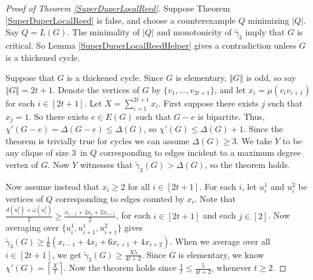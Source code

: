 \documentclass[12pt]{article}
\theoremstyle{plain}
\theoremstyle{definition}
\theoremstyle{remark}
\newcommand{\card}[1]{\left|#1\right|}
\newcommand{\size}[1]{\left\Vert#1\right\Vert}
\newcommand{\ceil}[1]{\left\lceil#1\right\rceil}
\begin{document}
\begin{proof}[Proof of Theorem \ref{SuperDuperLocalReed}]
Suppose Theorem \ref{SuperDuperLocalReed} is false, and choose a counterexample
$Q$ minimizing $\card{Q}$.  Say $Q = L(G)$.  The minimality of $\card{Q}$ and
monotonicity of $\tilde{\gamma}_3$ imply that $G$ is critical.  So Lemma
\ref{SuperDuperLocalReedHelper} gives
a contradiction unless $G$ is a thickened cycle.  

Suppose that $G$ is a thickened cycle.  Since $G$ is elementary, $\size{G}$ is
odd, so say $\size{G}=2t+1$.  Denote the vertices of $G$ by $\{v_1,\ldots,
v_{2t+1}\}$, and let $x_i = \mu(v_iv_{i+1})$ for each $i\in [2t+1]$.  Let
$X=\sum_{i=1}^{2t+1}x_i$.  First suppose there exists $j$ such that $x_j=1$.
So there exists $e\in E(G)$ such that $G-e$ is bipartite.  Thus,
$\chi'(G-e)=\Delta(G-e)\le \Delta(G)$, so $\chi'(G)\le \Delta(G)+1$.
Since the theorem is trivially true for cycles we can assume $\Delta(G)\ge 3$.
We take $Y$ to be any clique of size 3\ in $Q$ corresponding to edges incident
to a maximum degree vertex of $G$. Now $Y$ witnesses that
$\tilde{\gamma}_3(G)>\Delta(G)$, so the theorem holds.

Now assume instead that $x_i\ge 2$ for all $i\in[2t+1]$.
For each $i$, let $u^1_i$ and $u^2_i$ be vertices of $Q$ corresponding to edges
counted by $x_i$.  Note that $\frac{d(u^j_i)+\omega(u^j_i)}2 \ge
\frac{x_{i-1}+2x_i+2x_{i+1}}2$, for each $i\in[2t+1]$ and each $j\in[2]$.
Now averaging over $\{u^1_i, u^1_{i+1}, u^2_{i+1}\}$
gives
$\tilde{\gamma}_3(G) \ge \frac16\left(x_{i-1}+4x_i+6x_{i+1}+4x_{i+2}\right).$
%
When we average over all $i \in [2t+1]$, we get $\tilde{\gamma}_3(G) \ge
\frac{X5}{4t+2}$.  Since $G$ is elementary, we know $\chi'(G) = \ceil{\frac{X}t}$.  
Now the theorem holds since $\frac1t \le \frac5{4t+2}$, whenever $t \ge 2$.
%
\end{proof}  


\end{document}

